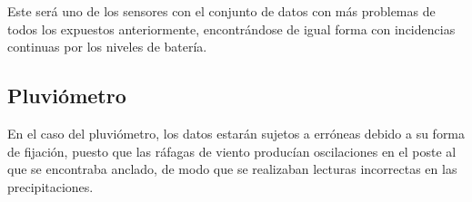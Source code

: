Este será uno de los sensores con el conjunto de datos con más problemas de todos los 
expuestos anteriormente, encontrándose de igual forma con incidencias continuas por los niveles
de batería.

\newpage
\subsection{Pluviómetro}


En el caso del pluviómetro, los datos estarán sujetos a erróneas debido a su forma
de fijación, puesto que las ráfagas de viento producían oscilaciones
en el poste al que se encontraba anclado, de modo que se realizaban lecturas incorrectas
en las precipitaciones.
